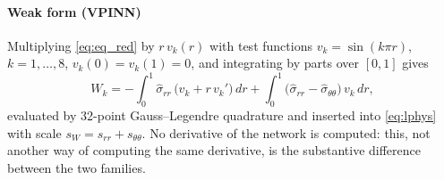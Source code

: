 \paragraph{Weak form (VPINN)}
Multiplying \eqref{eq:eq_red} by $r\,v_k(r)$ with test functions
$v_k=\sin(k\pi r)$, $k=1,\dots,8$, $v_k(0)=v_k(1)=0$, and integrating by parts over
$[0,1]$ gives \citep{kharazmi2021}
\begin{equation}
  W_k = -\int_0^1 \hat\sigma_{rr}\,\bigl(v_k + r\,v_k'\bigr)\,dr
        + \int_0^1 \bigl(\hat\sigma_{rr}-\hat\sigma_{\theta\theta}\bigr)\,v_k\,dr ,
  \label{eq:weak}
\end{equation}
evaluated by 32-point Gauss--Legendre quadrature and inserted into
\eqref{eq:lphys} with scale $s_W=s_{rr}+s_{\theta\theta}$.
No derivative of the network is computed: this, not another way of computing the
same derivative, is the substantive difference between the two families.

